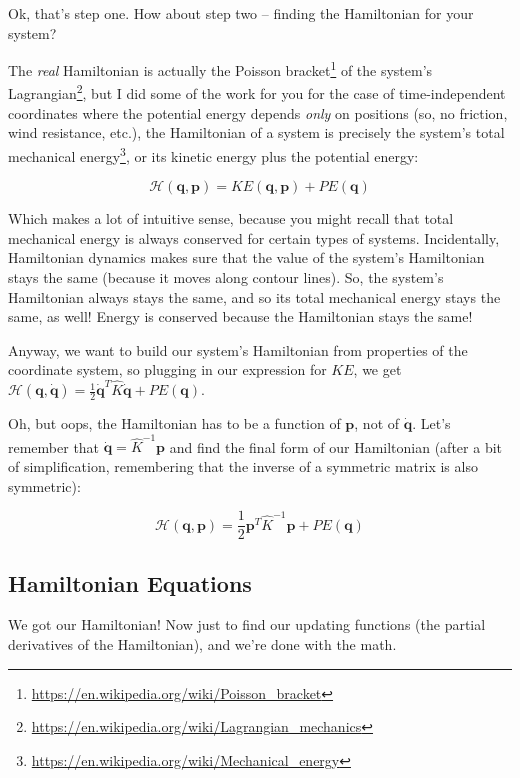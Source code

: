 \documentclass[]{article}
\renewcommand{\href}[2]{#2\footnote{\url{#1}}}
\begin{document}
Ok, that's step one. How about step two -- finding the Hamiltonian for your
system?

The \emph{real} Hamiltonian is actually the
\href{https://en.wikipedia.org/wiki/Poisson_bracket}{Poisson bracket} of the
system's \href{https://en.wikipedia.org/wiki/Lagrangian_mechanics}{Lagrangian},
but I did some of the work for you for the case of time-independent coordinates
where the potential energy depends \emph{only} on positions (so, no friction,
wind resistance, etc.), the Hamiltonian of a system is precisely the system's
total \href{https://en.wikipedia.org/wiki/Mechanical_energy}{mechanical energy},
or its kinetic energy plus the potential energy:

\[
\mathcal{H}(\mathbf{q},\mathbf{p}) = KE(\mathbf{q},\mathbf{p}) + PE(\mathbf{q})
\]

Which makes a lot of intuitive sense, because you might recall that total
mechanical energy is always conserved for certain types of systems.
Incidentally, Hamiltonian dynamics makes sure that the value of the system's
Hamiltonian stays the same (because it moves along contour lines). So, the
system's Hamiltonian always stays the same, and so its total mechanical energy
stays the same, as well! Energy is conserved because the Hamiltonian stays the
same!

Anyway, we want to build our system's Hamiltonian from properties of the
coordinate system, so plugging in our expression for \(KE\), we get
\(\mathcal{H}(\mathbf{q},\dot{\mathbf{q}}) = \frac{1}{2} \dot{\mathbf{q}}^T \hat{K} \dot{\mathbf{q}} + PE(\mathbf{q})\).

Oh, but oops, the Hamiltonian has to be a function of \(\mathbf{p}\), not of
\(\dot{\mathbf{q}}\). Let's remember that
\(\dot{\mathbf{q}} = \hat{K}^{-1} \mathbf{p}\) and find the final form of our
Hamiltonian (after a bit of simplification, remembering that the inverse of a
symmetric matrix is also symmetric):

\[
\mathcal{H}(\mathbf{q},\mathbf{p}) = \frac{1}{2} \mathbf{p}^T \hat{K}^{-1} \mathbf{p} + PE(\mathbf{q})
\]

\subsection{Hamiltonian Equations}\label{hamiltonian-equations}

We got our Hamiltonian! Now just to find our updating functions (the partial
derivatives of the Hamiltonian), and we're done with the math.
\end{document}
